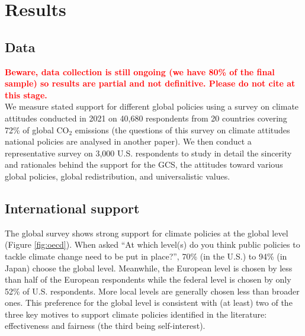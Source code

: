 \section{Results}
\subsection{Data}
\textcolor{red}{\textbf{Beware, data collection is still ongoing (we have 80\% of the final sample) so results are partial and not definitive. Please do not cite at this stage.}} \\
We measure stated support for different global policies using %
a survey on climate attitudes conducted in 2021 on 40,680 respondents from 20 countries covering 72\% of global CO$_\text{2}$ emissions (the questions of this survey on climate attitudes national policies are analysed in another paper\cite{dechezlepretre_fighting_2022}). We then conduct a representative survey on 3,000 U.S. respondents to study in detail the sincerity and rationales behind the support for the GCS, the attitudes toward various global policies, global redistribution, and universalistic values.

\subsection{International support}
The global survey shows strong support for climate policies at the global level (Figure \ref{fig:oecd}). When asked ``At which level(s) do you think public policies to tackle climate change need to be put in place?'', 70\% (in the U.S.) to 94\% (in Japan) choose the global level. Meanwhile, the European level is chosen by less than half of the European respondents while the federal level is chosen by only 52\% of U.S. respondents. More local levels are generally chosen less than broader ones. This preference for the global level is consistent with (at least) two of the three key motives to support climate policies identified in the literature:\cite{klenert_making_2018,douenne_yellow_2022,dechezlepretre_fighting_2022} effectiveness and fairness (the third being self-interest). %


